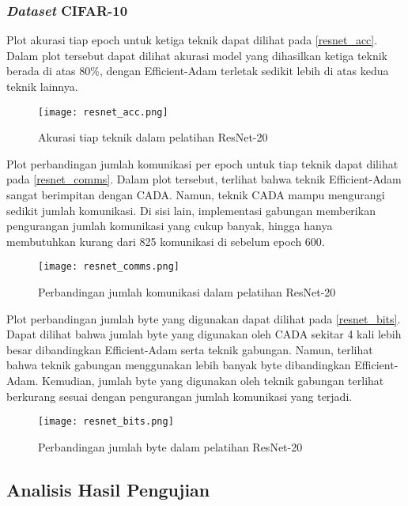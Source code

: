 \subsubsection{\emph{Dataset} CIFAR-10}

Plot akurasi tiap epoch untuk ketiga teknik dapat dilihat pada \autoref{resnet_acc}. Dalam plot tersebut dapat dilihat akurasi model yang dihasilkan ketiga teknik berada di atas 80\%, dengan Efficient-Adam terletak sedikit lebih di atas kedua teknik lainnya.

\begin{figure}[H]
  \centering
  \texttt{[image: resnet\_acc.png]}
  \caption{Akurasi tiap teknik dalam pelatihan ResNet-20}\label{resnet_acc}
\end{figure}

Plot perbandingan jumlah komunikasi per epoch untuk tiap teknik dapat dilihat pada \autoref{resnet_comms}. Dalam plot tersebut, terlihat bahwa teknik Efficient-Adam sangat berimpitan dengan CADA. Namun, teknik CADA mampu mengurangi sedikit jumlah komunikasi. Di sisi lain, implementasi gabungan memberikan pengurangan jumlah komunikasi yang cukup banyak, hingga hanya membutuhkan kurang dari 825 komunikasi di sebelum epoch 600.

\begin{figure}[H]
  \centering
  \texttt{[image: resnet\_comms.png]}
  \caption{Perbandingan jumlah komunikasi dalam pelatihan ResNet-20}\label{resnet_comms}
\end{figure}

Plot perbandingan jumlah byte yang digunakan dapat dilihat pada \autoref{resnet_bits}. Dapat dilihat bahwa jumlah byte yang digunakan oleh CADA sekitar 4 kali lebih besar dibandingkan Efficient-Adam serta teknik gabungan. Namun, terlihat bahwa teknik gabungan menggunakan lebih banyak byte dibandingkan Efficient-Adam. Kemudian, jumlah byte yang digunakan oleh teknik gabungan terlihat berkurang sesuai dengan pengurangan jumlah komunikasi yang terjadi.

\begin{figure}[H]
  \centering
  \texttt{[image: resnet\_bits.png]}
  \caption{Perbandingan jumlah byte dalam pelatihan ResNet-20}\label{resnet_bits}
\end{figure}


\subsection{Analisis Hasil Pengujian}

